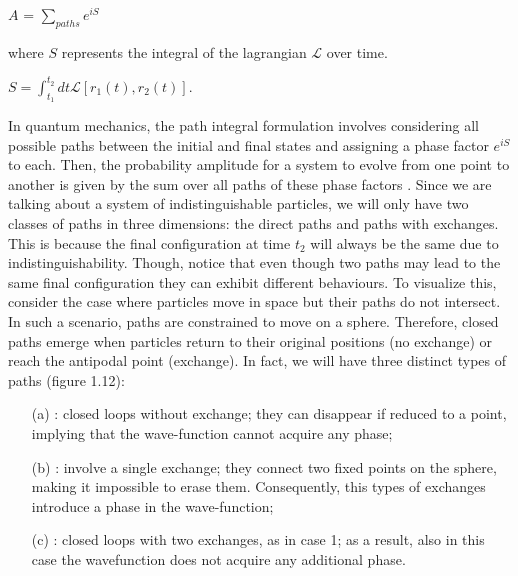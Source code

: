 \documentclass{Configuration_Files/PoliMi3i_thesis}
\begin{document}
\begin{center}
	$A$ = $\sum_{paths} e^{iS}$
\end{center}

where $S$ represents the integral of the lagrangian $\mathcal{L}$ over time.

\begin{center}
	$S = \int_{t_1}^{t_2}dt \textit{$\mathcal{L}$} [ r_1(t),r_2(t) ] $.
\end{center}

In quantum mechanics, the path integral formulation involves considering all possible paths between the initial and final states and assigning a phase factor $e^{iS}$ to each. Then, the probability amplitude for a system to evolve from one point to another is given by the sum over all paths of these phase factors \cite{Wil91}. Since we are talking about a system of indistinguishable particles, we will only have two classes of paths in three dimensions: the direct paths and paths with exchanges. This is because the final configuration at time $t_2$ will always be the same due to indistinguishability. Though, notice that even though two paths may lead to the same final configuration they can exhibit different behaviours. To visualize this, consider the case where particles move in space but their paths do not intersect. In such a scenario, paths are constrained to move on a sphere. Therefore, closed paths emerge when particles return to their original positions (no exchange) or reach the antipodal point (exchange). In fact, we will have three distinct types of paths (figure 1.12): 



\begin{enumerate}
	\item[(a)]: closed loops without exchange; they can disappear if reduced to a point, implying that the wave-function cannot acquire any phase; 
	
	\item[(b)] : involve a single exchange; they connect two fixed points on the sphere, making it impossible to erase them. Consequently, this types of exchanges introduce a phase in the wave-function;
	
	\item[(c)] : closed loops with two exchanges, as in case 1; as a result, also in this case the wavefunction does not acquire any additional phase.
\end{enumerate}
\end{document}

